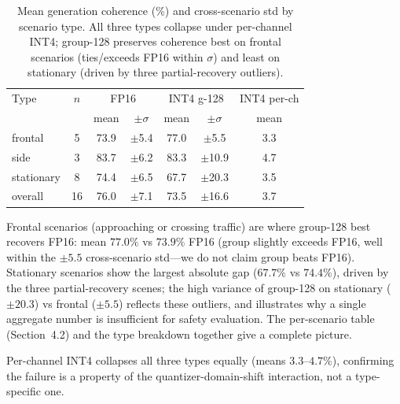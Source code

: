 \documentclass[11pt]{article}
\begin{document}
\begin{table}[h]\centering
\caption{Mean generation coherence (\%) and cross-scenario std by scenario type.
All three types collapse under per-channel INT4; group-128 preserves coherence
best on frontal scenarios (ties/exceeds FP16 within $\sigma$) and least on
stationary (driven by three partial-recovery outliers).}
\label{tab:scentype}
\begin{tabular}{lcccccc}
\toprule
Type & $n$ & \multicolumn{2}{c}{FP16} & \multicolumn{2}{c}{INT4 g-128} & INT4 per-ch \\
     &     & mean & $\pm\sigma$ & mean & $\pm\sigma$ & mean \\
\midrule
frontal     & 5  & 73.9 & $\pm$5.4  & 77.0 & $\pm$5.5  & 3.3 \\
side        & 3  & 83.7 & $\pm$6.2  & 83.3 & $\pm$10.9 & 4.7 \\
stationary  & 8  & 74.4 & $\pm$6.5  & 67.7 & $\pm$20.3 & 3.5 \\
\midrule
overall     & 16 & 76.0 & $\pm$7.1  & 73.5 & $\pm$16.6 & 3.7 \\
\bottomrule
\end{tabular}
\end{table}

Frontal scenarios (approaching or crossing traffic) are where group-128 best recovers FP16:
mean $77.0\%$ vs $73.9\%$ FP16 (group slightly exceeds FP16, well within the $\pm5.5$
cross-scenario std---we do not claim group beats FP16). Stationary scenarios show the largest
absolute gap ($67.7\%$ vs $74.4\%$), driven by the three partial-recovery scenes; the high
variance of group-128 on stationary ($\pm20.3$) vs frontal ($\pm5.5$) reflects these outliers,
and illustrates why a single aggregate number is insufficient for safety evaluation. The
per-scenario table (Section~4.2) and the type breakdown together give a complete picture.

Per-channel INT4 collapses all three types equally (means $3.3$--$4.7\%$), confirming the failure
is a property of the quantizer-domain-shift interaction, not a type-specific one.
\end{document}
